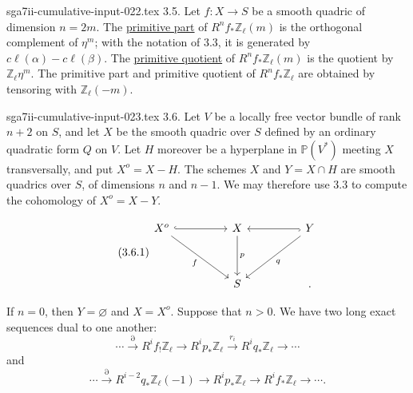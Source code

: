 \begin{filecontents*}{sga7ii-cumulative-input-022.tex}
3.5. Let $f:X\longrightarrow S$ be a smooth quadric of dimension
$n=2m$.  The \underline{primitive part} of
$R^nf_*\mathbb Z_\ell(m)$ is the orthogonal complement of $\eta^m$;
with the notation of 3.3, it is generated by
$c\ell(\alpha)-c\ell(\beta)$.  The \underline{primitive quotient} of
$R^nf_*\mathbb Z_\ell(m)$ is the quotient by
$\mathbb Z_\ell\eta^m$.  The primitive part and primitive quotient of
$R^nf_*\mathbb Z_\ell$ are obtained by tensoring with
$\mathbb Z_\ell(-m)$.

\end{filecontents*}
\begin{filecontents*}{sga7ii-cumulative-input-023.tex}
3.6. Let $V$ be a locally free vector bundle of rank $n+2$ on $S$, and
let $X$ be the smooth quadric over $S$ defined by an ordinary quadratic
form $Q$ on $V$.  Let $H$ moreover be a hyperplane in
$\mathbb P(V^*)$ meeting $X$ transversally, and put $X^o=X-H$.  The
schemes $X$ and $Y=X\cap H$ are smooth quadrics over $S$, of dimensions
$n$ and $n-1$.  We may therefore use 3.3 to compute the cohomology of
$X^o=X-Y$.


\begin{equation}\tag{3.6.1}
\begin{tikzcd}[column sep=huge,row sep=huge]
X^o \arrow[r,hook] \arrow[rd,"f"']
  & X \arrow[d,"p"]
  & Y \arrow[l,hook] \arrow[ld,"q"]\\
{} & S & \mathord{.}
\end{tikzcd}
\end{equation}

If $n=0$, then $Y=\varnothing$ and $X=X^o$.  Suppose that $n>0$.  We
have two long exact sequences dual to one another:
\begin{equation}\tag{3.6.2}
\cdots\xrightarrow{\partial}R^if_!\mathbb Z_\ell
\longrightarrow R^ip_*\mathbb Z_\ell
\xrightarrow{r_i}R^iq_*\mathbb Z_\ell\longrightarrow\cdots
\end{equation}
and
\begin{equation}\tag{3.6.3}
\cdots\xrightarrow{\partial}R^{i-2}q_*\mathbb Z_\ell(-1)
\longrightarrow R^ip_*\mathbb Z_\ell
\longrightarrow R^if_*\mathbb Z_\ell\longrightarrow\cdots.
\end{equation}


\end{filecontents*}
